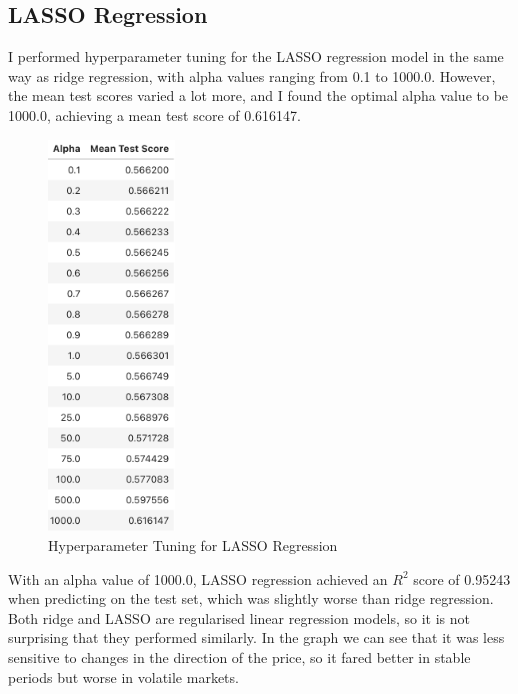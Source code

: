 \documentclass[a4paper, 11pt]{article}
\begin{document}
\subsection{LASSO Regression}
I performed hyperparameter tuning for the LASSO regression model in the same way as ridge regression, with alpha values ranging from 0.1 to 1000.0. However, the mean test scores varied a lot more, and I found the optimal alpha value to be 1000.0, achieving a mean test score of 0.616147.

\begin{figure}[H]
    \begin{center}
        \includegraphics[width=0.3\textwidth]{Hyperparameter Tuning for LASSO Regression.png}
        \caption{Hyperparameter Tuning for LASSO Regression}
    \end{center}
\end{figure}

With an alpha value of 1000.0, LASSO regression achieved an $R^2$ score of 0.95243 when predicting on the test set, which was slightly worse than ridge regression. Both ridge and LASSO are regularised linear regression models, so it is not surprising that they performed similarly. In the graph we can see that it was less sensitive to changes in the direction of the price, so it fared better in stable periods but worse in volatile markets. 
\end{document}
